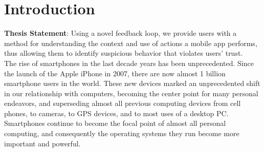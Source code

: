 \chapter{Introduction}
\label{sec:intro}

\textbf{Thesis Statement}: Using a novel feedback loop, we provide users with a method for understanding the context and use of actions a mobile app performs, thus allowing them to identify suspicious behavior that violates users' trust.\\


The rise of smartphones in the last decade years has been unprecedented. Since the launch of the Apple iPhone in 2007, there are now almost 1 billion smartphone users in the world\citep{kpcbinternetreport2012}. These new devices marked an unprecedented shift in our relationship with computers, becoming the center point for many personal endeavors, and superseding almost all previous computing devices from cell phones, to cameras, to GPS devices, and to most uses of a desktop PC\citep{hua2012introduction}. Smartphones continue to become the focal point of almost all personal computing, and consequently the operating systems they run become more important and powerful.

